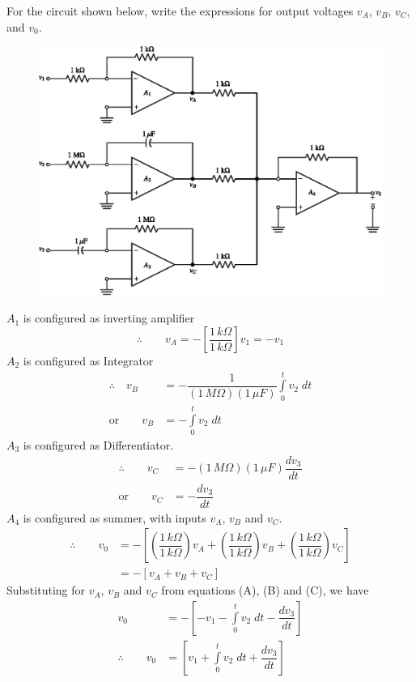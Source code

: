 \begin{example}%
For the circuit shown below, write the expressions for output voltages $v_{A}$, $v_{B}$, $v_{C}$, and $v_{0}$.
\begin{figure}[H]
\centering
\includegraphics{chap4/exp4.28.eps}
\end{figure}
\end{example}

\begin{solution}
$A_{1}$ is configured as inverting amplifier
\begin{equation*}
\therefore\qquad v_{A}=-\left[\dfrac{1\,k\Omega}{1\,k\Omega}\right]v_{1}=-v_{1}\tag{A}
\end{equation*}
$A_{2}$ is configured as Integrator
\begin{align*}
\therefore\quad v_{B} &=-\dfrac{1}{(1\,M\Omega)(1\,\mu F)}\int\limits^{t}_{0}v_{2}\; dt\\[5pt]
\text{or}\qquad v_{B} &= -\int\limits^{t}_{0}v_{2}\; dt\tag{B}
\end{align*}
$A_{3}$ is configured as Differentiator.
\begin{align*}
\therefore\qquad v_{C} &=-(1\,M\Omega)(1\,\mu F)\dfrac{dv_{3}}{dt}\\[5pt]
\text{or}\qquad v_{C} &= -\dfrac{dv_{3}}{dt}\tag{C}
\end{align*}
$A_{4}$ is configured as summer, with inputs $v_{A}$, $v_{B}$ and $v_{C}$.
\begin{align*}
\therefore\qquad v_{0} &= -\left[\left(\dfrac{1\,k\Omega}{1\,k\Omega}\right)v_{A}+\left(\dfrac{1\,k\Omega}{1\,k\Omega}\right)v_{B}+\left(\dfrac{1\,k\Omega}{1\,k\Omega}\right)v_{C}\right]\\[5pt]
&= -\left[v_{A}+v_{B}+v_{C}\right]\tag{D}
\end{align*}
Substituting for $v_{A}$, $v_{B}$ and $v_{C}$ from equations (A), (B) and (C), we have
\begin{align*}
v_{0} &=-\left[-v_{1}-\int\limits^{t}_{0}v_{2}\;dt-\dfrac{d v_{3}}{dt}\right]\\[5pt]
\therefore\qquad v_{0} &= \left[v_{1}+\int\limits^{t}_{0}v_{2}\;dt+\dfrac{dv_{3}}{dt}\right]\tag{E}
\end{align*}
\end{solution}


